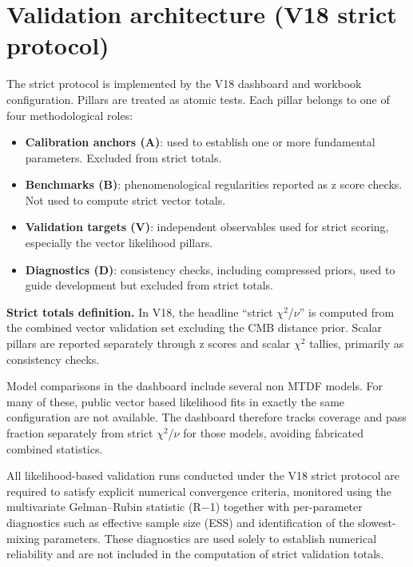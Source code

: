 \documentclass[11pt,a4paper]{article}
\begin{document}
\section{Validation architecture (V18 strict protocol)}
\label{sec:sec6}
The strict protocol is implemented by the V18 dashboard and workbook configuration. Pillars are treated as atomic tests. Each pillar belongs to one of four methodological roles:

\begin{itemize}
  \item \textbf{Calibration anchors (A)}: used to establish one or more fundamental parameters. Excluded from strict totals.
  \item \textbf{Benchmarks (B)}: phenomenological regularities reported as z score checks. Not used to compute strict vector totals.
  \item \textbf{Validation targets (V)}: independent observables used for strict scoring, especially the vector likelihood pillars.
  \item \textbf{Diagnostics (D)}: consistency checks, including compressed priors, used to guide development but excluded from strict totals.
\end{itemize}

\begin{mdframed}[linecolor=accent,linewidth=0.5pt,backgroundcolor=callout-bg,leftline=true,rightline=true,topline=true,bottomline=true,innerleftmargin=8pt,innerrightmargin=8pt,innertopmargin=6pt,innerbottommargin=6pt]
\textbf{Strict totals definition.} In V18, the headline ``strict $\chi$$^{2}$/$\nu$'' is computed from the combined vector validation set excluding the CMB distance prior. Scalar pillars are reported separately through z scores and scalar $\chi$$^{2}$ tallies, primarily as consistency checks.
\end{mdframed}

Model comparisons in the dashboard include several non MTDF models. For many of these, public vector based likelihood fits in exactly the same configuration are not available. The dashboard therefore tracks coverage and pass fraction separately from strict $\chi$$^{2}$/$\nu$ for those models, avoiding fabricated combined statistics.

All likelihood-based validation runs conducted under the V18 strict protocol are required to satisfy explicit numerical convergence criteria, monitored using the multivariate Gelman--Rubin statistic (R$-$1) together with per-parameter diagnostics such as effective sample size (ESS) and identification of the slowest-mixing parameters. These diagnostics are used solely to establish numerical reliability and are not included in the computation of strict validation totals.
\end{document}

